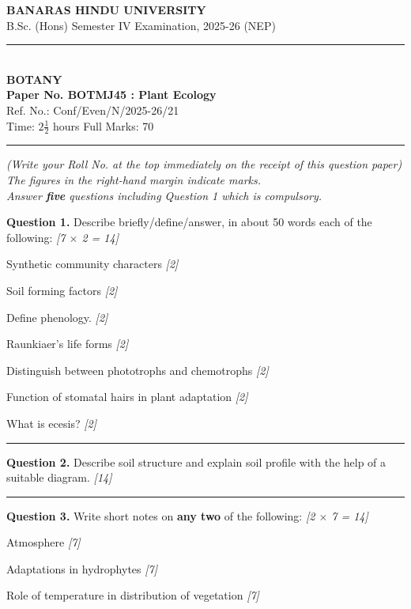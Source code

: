\documentclass[11pt,a4paper]{article}
\newcommand{\pts}[1]{\hfill \textit{[#1]}}
\begin{document}
\begin{center}
  {\large\bfseries BANARAS HINDU UNIVERSITY}\\[2pt]
  {\normalsize B.Sc. (Hons) Semester IV Examination, 2025-26 (NEP)}\\[6pt]
  \rule{0.8\linewidth}{0.5pt}\\[6pt]
  {\large\bfseries BOTANY}\\[4pt]
  {\large\bfseries Paper No. BOTMJ45 : Plant Ecology}\\[2pt]
  {\small Ref. No.: Conf/Even/N/2025-26/21}\\[4pt]
  {\normalsize Time: $2\frac{1}{2}$ hours \hfill Full Marks: 70}
\end{center}

\rule{\linewidth}{0.4pt}

\smallskip

\noindent \textit{(Write your Roll No. at the top immediately on the receipt of this question paper)}\\[2pt]
\noindent \textit{The figures in the right-hand margin indicate marks.}\\[1pt]
\noindent \textit{Answer \textbf{five} questions including Question 1 which is compulsory.}

\bigskip

\noindent \textbf{Question 1.} Describe briefly/define/answer, in about 50 words each of the following: \pts{7 $\times$ 2 = 14}
\begin{parts}
  \item Synthetic community characters \pts{2}
  \item Soil forming factors \pts{2}
  \item Define phenology. \pts{2}
  \item Raunkiaer's life forms \pts{2}
  \item Distinguish between phototrophs and chemotrophs \pts{2}
  \item Function of stomatal hairs in plant adaptation \pts{2}
  \item What is ecesis? \pts{2}
\end{parts}

\bigskip
\rule{\linewidth}{0.2pt}
\bigskip

\noindent \textbf{Question 2.} Describe soil structure and explain soil profile with the help of a suitable diagram. \pts{14}

\medskip\rule{\linewidth}{0.2pt}\medskip

\noindent \textbf{Question 3.} Write short notes on \textbf{any two} of the following: \pts{2 $\times$ 7 = 14}
\begin{parts}
  \item Atmosphere \pts{7}
  \item Adaptations in hydrophytes \pts{7}
  \item Role of temperature in distribution of vegetation \pts{7}
\end{parts}
\end{document}
